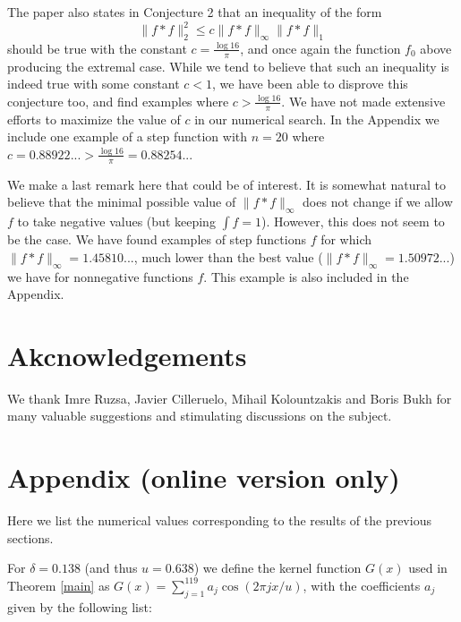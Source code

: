 \documentclass[12pt]{amsart}
\theoremstyle{definition}
\begin{document}
\bigskip

The paper \cite{martin} also states in Conjecture 2 that an
inequality of the form \begin{equation}\label{c}\|f\ast f\|_2^2\le
c \|f\ast f\|_\infty \|f\ast f\|_1 \end{equation} should be true
with the constant $c=\frac{\log 16}{\pi}$, and once again the
function $f_0$ above producing the extremal case. While we tend to
believe that such an inequality is indeed true with some constant
$c < 1$, we have been able to disprove this conjecture too, and
find examples where $c>\frac{\log 16}{\pi}$. We have not made
extensive efforts to maximize the value of $c$ in our numerical
search. In the Appendix we include one example of a step function
with $n = 20$ where $c = 0.88922... > \frac{\log 16}{\pi} =
0.88254...$

\medskip

We make a last remark here that could be of interest. It is
somewhat natural to believe that the minimal possible value of $\|
f \ast f \|_{\infty}$ does not change if we allow $f$ to take
negative values (but keeping $\int f=1$). However, this does not
seem to be the case. We have found examples of step functions $f$
for which $\| f \ast f \|_{\infty} = 1.45810...$, much lower than
the best value ($\| f \ast f \|_{\infty} =1.50972...$) we have for
nonnegative functions $f$. This example is also included in the
Appendix.

\section*{Akcnowledgements}
We thank Imre Ruzsa, Javier Cilleruelo, Mihail Kolountzakis and
Boris Bukh for many valuable suggestions and stimulating
discussions on the subject.

\section*{Appendix (online version only)}
Here we list the numerical values corresponding to the results of
the previous sections.

\medskip

For $\delta=0.138$ (and thus $u=0.638$) we define the kernel
function $G(x)$ used in Theorem \ref{main} as
$G(x)=\sum_{j=1}^{119} a_j \cos (2\pi j x/u)$, with the
coefficients $a_j$ given by the following list:
\end{document}
